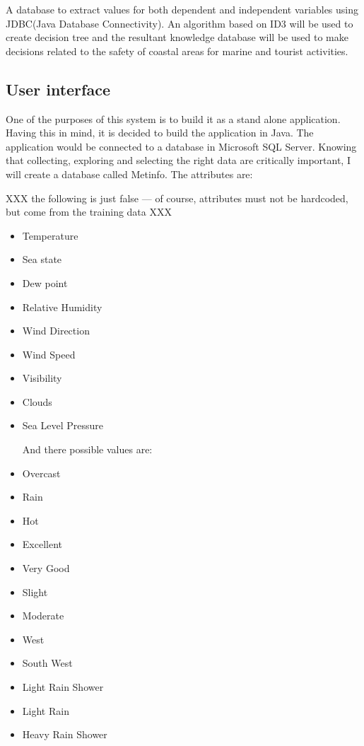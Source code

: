 \documentclass{article}
\begin{document}
 A database to extract values for both dependent and independent variables using JDBC(Java Database Connectivity).
An algorithm based on ID3 will be used to create decision tree and the resultant knowledge database will be used to make decisions related to the safety of coastal areas for marine and tourist activities.

\subsection{User interface}

One of the purposes of this system is to build it as a stand alone application. Having this in mind, it is decided to build the application in Java. The application would be connected to a database in Microsoft SQL Server. Knowing that collecting, exploring and selecting the right data are critically important, I will create a database called Metinfo.
The attributes are:

XXX the following is just false --- of course, attributes must not be
hardcoded, but come from the training data XXX

\begin{itemize}
\item Temperature 
\item Sea state
\item Dew point
\item Relative Humidity
\item Wind Direction
\item Wind Speed
\item Visibility
\item Clouds 
\item Sea Level Pressure

And there possible values are: 

\item Overcast
\item Rain
\item Hot
\item Excellent
\item Very Good
\item Slight
\item Moderate
\item West
\item South West
\item Light Rain Shower
\item Light Rain
\item Heavy Rain Shower


\end{itemize}
\pagebreak
\end{document}
